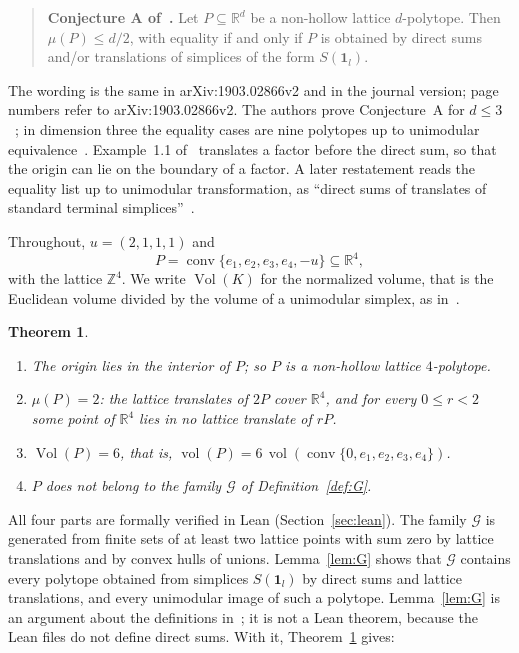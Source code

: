 \documentclass[11pt]{article}
\newtheorem{theorem}{Theorem}
\theoremstyle{definition}
\theoremstyle{remark}
\newcommand{\R}{\mathbb R}
\newcommand{\Z}{\mathbb Z}
\newcommand{\one}{\mathbf 1}
\newcommand{\conv}{\operatorname{conv}}
\newcommand{\Vol}{\operatorname{Vol}}
\newcommand{\vol}{\operatorname{vol}}
\newcommand{\G}{\mathcal G}
\begin{document}
\begin{quote}
\textbf{Conjecture A of~\cite{css}.} Let $P\subseteq\R^d$ be a non-hollow
lattice $d$-polytope. Then $\mu(P)\le d/2$, with equality if and only if $P$
is obtained by direct sums and/or translations of simplices of the form
$S(\one_l)$.
\end{quote}

\noindent The wording is the same in arXiv:1903.02866v2 and in the journal
version; page numbers refer to arXiv:1903.02866v2. The authors prove
Conjecture~A for $d\le3$~\cite[Theorem~1.3]{css}; in dimension three the
equality cases are nine polytopes up to unimodular
equivalence~\cite[Example~1.1 and Lemma~3.8]{css}. Example~1.1 of~\cite{css}
translates a factor before the direct sum, so that the origin can lie on the
boundary of a factor. A later restatement reads the equality list up to
unimodular transformation, as ``direct sums of translates of standard terminal
simplices''~\cite[p.~2 and Conjecture~4.1]{kr}.

Throughout, $u=(2,1,1,1)$ and
\[
P=\conv\{e_1,e_2,e_3,e_4,-u\}\subseteq\R^4,
\]
with the lattice $\Z^4$. We write $\Vol(K)$ for the normalized volume, that is
the Euclidean volume divided by the volume of a unimodular simplex, as
in~\cite[p.~3]{css}.

\begin{theorem}\label{thm:main}
\begin{enumerate}
\item[\textup{(a)}] The origin lies in the interior of $P$; so $P$ is a
non-hollow lattice $4$-polytope.
\item[\textup{(b)}] $\mu(P)=2$: the lattice translates of $2P$ cover $\R^4$,
and for every $0\le r<2$ some point of $\R^4$ lies in no lattice translate of
$rP$.
\item[\textup{(c)}] $\Vol(P)=6$, that is, $\vol(P)=6\,\vol(\conv\{0,e_1,e_2,e_3,e_4\})$.
\item[\textup{(d)}] $P$ does not belong to the family $\G$ of
Definition~\ref{def:G}.
\end{enumerate}
\end{theorem}

\noindent All four parts are formally verified in Lean
(Section~\ref{sec:lean}). The family $\G$ is generated from finite sets of at
least two lattice points with sum zero by lattice translations and by convex
hulls of unions. Lemma~\ref{lem:G} shows that $\G$ contains every polytope
obtained from simplices $S(\one_l)$ by direct sums and lattice translations,
and every unimodular image of such a polytope. Lemma~\ref{lem:G} is an
argument about the definitions in~\cite{css}; it is not a Lean theorem,
because the Lean files do not define direct sums. With it,
Theorem~\ref{thm:main} gives:
\end{document}
